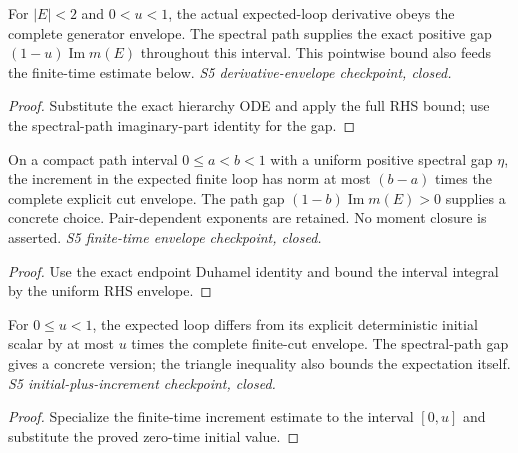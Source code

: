 \begin{lemma}
  \label{lem:loop-hierarchy-derivative-bound}
  \leanok
  For $|E|<2$ and $0<u<1$, the actual expected-loop derivative obeys
  the complete generator envelope. The spectral path supplies the exact
  positive gap $(1-u)\operatorname{Im}m(E)$ throughout this interval.
  This pointwise bound also feeds the finite-time estimate below.
  \emph{S5 derivative-envelope checkpoint, closed.}
\end{lemma}
\begin{proof}\leanok
  Substitute the exact hierarchy ODE and apply the full RHS bound;
  use the spectral-path imaginary-part identity for the gap.
\end{proof}

\begin{lemma}
  \label{lem:loop-hierarchy-integral-bound}
  \leanok
  On a compact path interval $0\leq a<b<1$ with a uniform positive
  spectral gap $\eta$, the increment in the expected finite loop has
  norm at most $(b-a)$ times the complete explicit cut envelope.
  The path gap $(1-b)\operatorname{Im}m(E)>0$ supplies a concrete choice.
  Pair-dependent exponents are retained. No moment closure is asserted.
  \emph{S5 finite-time envelope checkpoint, closed.}
\end{lemma}
\begin{proof}\leanok
  Use the exact endpoint Duhamel identity and bound the interval
  integral by the uniform RHS envelope.
\end{proof}

\begin{lemma}
  \label{lem:loop-hierarchy-from-initial-bound}
  \leanok
  For $0\leq u<1$, the expected loop differs from its explicit
  deterministic initial scalar by at most $u$ times the complete
  finite-cut envelope. The spectral-path gap gives a concrete version;
  the triangle inequality also bounds the expectation itself.
  \emph{S5 initial-plus-increment checkpoint, closed.}
\end{lemma}
\begin{proof}\leanok
  Specialize the finite-time increment estimate to the interval
  $[0,u]$ and substitute the proved zero-time initial value.
\end{proof}

